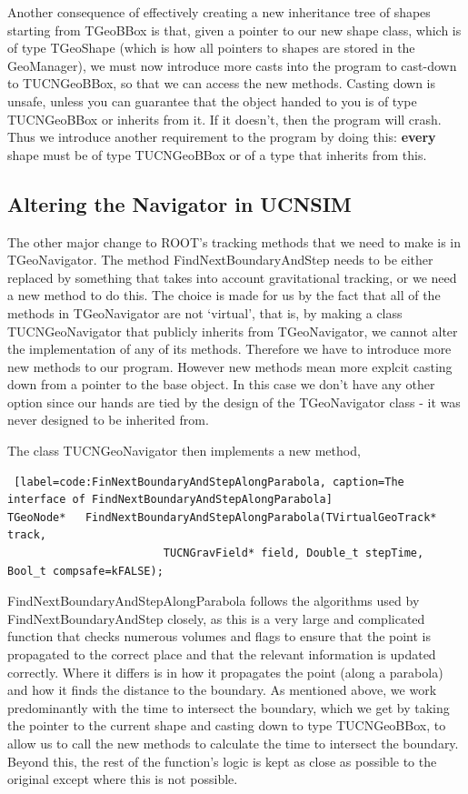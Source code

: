\documentclass[11pt,a4paper,oneside]{article}
\begin{document}
Another consequence of effectively creating a new inheritance tree of shapes starting from TGeoBBox is that, given a pointer to our new shape class, which is of type TGeoShape (which is how all pointers to shapes are stored in the GeoManager), we must now introduce more casts into the program to cast-down to TUCNGeoBBox, so that we can access the new methods. Casting down is unsafe, unless you can guarantee that the object handed to you is of type TUCNGeoBBox or inherits from it. If it doesn't, then the program will crash. Thus we introduce another requirement to the program by doing this: \textbf{every} shape must be of type TUCNGeoBBox or of a type that inherits from this. 

\subsection{Altering the Navigator in UCNSIM}

The other major change to ROOT's tracking methods that we need to make is in TGeoNavigator. The method FindNextBoundaryAndStep needs to be either replaced by something that takes into account gravitational tracking, or we need a new method to do this. The choice is made for us by the fact that all of the methods in TGeoNavigator are not `virtual', that is, by making a class TUCNGeoNavigator that publicly inherits from TGeoNavigator, we cannot alter the implementation of any of its methods. Therefore we have to introduce more new methods to our program. However new methods mean more explcit casting down from a pointer to the base object. In this case we don't have any other option since our hands are tied by the design of the TGeoNavigator class - it was never designed to be inherited from. 

The class TUCNGeoNavigator then implements a new method, 

\begin{sourcecode} 
\begin{lstlisting} [label=code:FinNextBoundaryAndStepAlongParabola, caption=The interface of FindNextBoundaryAndStepAlongParabola]
TGeoNode*	FindNextBoundaryAndStepAlongParabola(TVirtualGeoTrack* track, 
						TUCNGravField* field, Double_t stepTime, Bool_t compsafe=kFALSE);
\end{lstlisting} 
\end{sourcecode}

FindNextBoundaryAndStepAlongParabola follows the algorithms used by FindNextBoundaryAndStep closely, as this is a very large and complicated function that checks numerous volumes and flags to ensure that the point is propagated to the correct place and that the relevant information is updated correctly. Where it differs is in how it propagates the point (along a parabola) and how it finds the distance to the boundary. As mentioned above, we work predominantly with the time to intersect the boundary, which we get by taking the pointer to the current shape and casting down to type TUCNGeoBBox, to allow us to call the new methods to calculate the time to intersect the boundary. Beyond this, the rest of the function's logic is kept as close as possible to the original except where this is not possible. 
\end{document}
